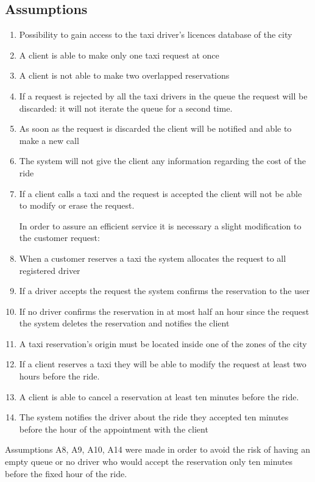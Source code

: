 \documentclass[a4paper]{article}
\begin{document}
\subsection{Assumptions}
\begin{enumerate}[label=\bfseries A\arabic*:]
\item Possibility to gain access to the taxi driver's licences database of the city
\item A client is able to make only one taxi request at once
\item A client is not able to make two overlapped reservations
\item If a request is rejected by all the taxi drivers in the queue the request will be discarded: it will not iterate the queue for a second time.
\item As soon as the request is discarded the client will be notified and able to make a new call
\item The system will not give the client any information regarding the cost of the ride
\item If a client calls a taxi and the request is accepted the client will not be able to modify or erase the request.

In order to assure an efficient service it is necessary a slight modification to the customer request:
\item When a customer reserves a taxi the system allocates the request to all registered driver 
\item If a driver accepts the request the system confirms the reservation to the user
\item If no driver confirms the reservation in at most half an hour since the request the system deletes the reservation and notifies the client
\item A taxi reservation's origin must be located inside one of the zones of the city
\item If a client reserves a taxi they will be able to modify the request at least two hours before the ride.
\item A client is able to cancel a reservation at least ten minutes before the ride.
\item The system notifies the driver about the ride they accepted ten minutes before the hour of the appointment with the client
\end{enumerate}

Assumptions A8, A9, A10, A14 were made in order to avoid the risk of having an empty queue or no driver who would accept the reservation only ten minutes before the fixed hour of the ride.
\end{document}
